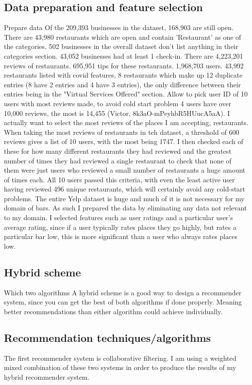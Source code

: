 \documentclass[conference]{IEEEtran}
\begin{document}
\subsection{Data preparation and feature selection}
Prepare data
Of the 209,393 businesses in the dataset, 168,903 are still open. 
There are 43,980 restaurants which are open and contain 'Restaurant' as one of the categories. 
502 businesses in the overall dataset don't list anything in their categories section. 
43,052 businesses had at least 1 check-in. 
There are 4,223,201 reviews of restaurants. 
695,951 tips for these restaurants. 
1,968,703 users. 
43,992 restaurants listed with covid features, 8 restaurants which make up 12 duplicate entries 
(8 have 2 entries and 4 have 3 entries), the only difference between their entries being in the 
"Virtual Services Offered" section. 
Allow to pick user ID of 10 users with most reviews made, to avoid cold start problem
4 users have over 10,000 reviews, the most is 14,455 (Victor, 8k3aO-mPeyhbR5HUucA5aA). 
I actually want to select the most reviews of the places I am accepting, restaurants. 
When taking the most reviews of restaurants in teh dataset, a threshold of 600 reviews gives a list of 10 users, 
with the most being 1747. 
I then checked each of these for how many different restaurants they had reviewed and the greatest number of times 
they had reviewed a single restaurant to check that none of them were just users who reviewed a small number of 
restaurants a huge amount of times each. 
All 10 users passed this criteria, with even the least active user having reviewed 496 unique restaurants, which will 
certainly avoid any cold-start problems. 
The entire Yelp dataset is huge and much of it is not necessary for my domain of bars.
As such I prepared the data by eliminating any data not relevant to my domain.
I selected features such as user ratings and a particular user's average rating,
since if a user typically rates places they go highly, but rates a particular bar low,
this is more significant than a user who always rates places low.

\subsection{Hybrid scheme}
Which two algorithms
A hybrid scheme is a good way to design a recommender system, since you can get the
best of both algorithms if done properly.
Meaning better recommendations than either algorithm could achieve individually.

\subsection{Recommendation techniques/algorithms}
The first recommender system is collaborative filtering.
I am using a weighted mixed combination of these two systems in order to produce the results
of my hybrid recommender system.
\end{document}

